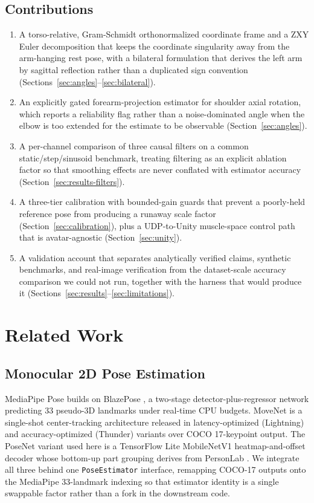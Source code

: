 \documentclass[conference]{IEEEtran}
\begin{document}
\subsection{Contributions}
\begin{enumerate}
\item A torso-relative, Gram-Schmidt orthonormalized coordinate frame and
a ZXY Euler decomposition that keeps the coordinate singularity away from
the arm-hanging rest pose, with a bilateral formulation that derives the
left arm by sagittal reflection rather than a duplicated sign convention
(Sections~\ref{sec:angles}--\ref{sec:bilateral}).
\item An explicitly gated forearm-projection estimator for shoulder axial
rotation, which reports a reliability flag rather than a noise-dominated
angle when the elbow is too extended for the estimate to be observable
(Section~\ref{sec:angles}).
\item A per-channel comparison of three causal filters on a common
static/step/sinusoid benchmark, treating filtering as an explicit
ablation factor so that smoothing effects are never conflated with
estimator accuracy (Section~\ref{sec:results-filters}).
\item A three-tier calibration with bounded-gain guards that prevent a
poorly-held reference pose from producing a runaway scale factor
(Section~\ref{sec:calibration}), plus a UDP-to-Unity muscle-space control
path that is avatar-agnostic (Section~\ref{sec:unity}).
\item A validation account that separates analytically verified claims,
synthetic benchmarks, and real-image verification from the dataset-scale
accuracy comparison we could not run, together with the harness that
would produce it (Sections~\ref{sec:results}--\ref{sec:limitations}).
\end{enumerate}

\section{Related Work}

\subsection{Monocular 2D Pose Estimation}
MediaPipe Pose builds on BlazePose \cite{bazarevsky2020blazepose}, a
two-stage detector-plus-regressor network predicting 33 pseudo-3D
landmarks under real-time CPU budgets. MoveNet \cite{movenet2021blog} is
a single-shot center-tracking architecture released in latency-optimized
(Lightning) and accuracy-optimized (Thunder) variants over COCO
17-keypoint output. The PoseNet variant used here is a TensorFlow Lite
MobileNetV1 heatmap-and-offset decoder whose bottom-up part grouping
derives from PersonLab \cite{papandreou2018personlab}. We integrate all
three behind one \texttt{PoseEstimator} interface, remapping COCO-17
outputs onto the MediaPipe 33-landmark indexing so that estimator
identity is a single swappable factor rather than a fork in the
downstream code.
\end{document}

